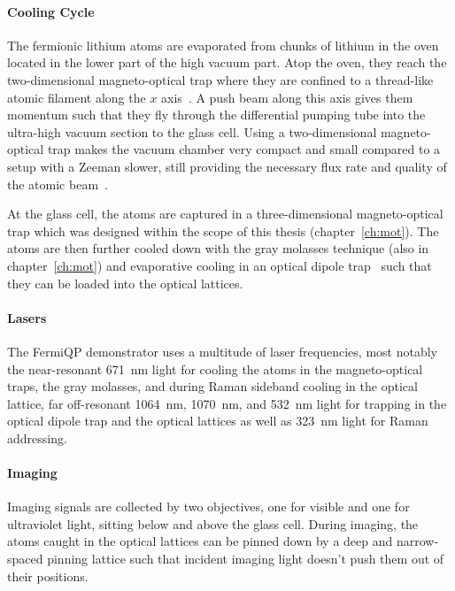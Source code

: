 \paragraph{Cooling Cycle}
The fermionic lithium atoms are evaporated from chunks of lithium in the oven located in the lower part of the high vacuum part. Atop the oven, they reach the two-dimensional magneto-optical trap where they are confined to a thread-like atomic filament along the $x$ axis~\cite{qesja_design_2022}.  A push beam along this axis gives them momentum such that they fly through the differential pumping tube into the ultra-high vacuum section to the glass cell. Using a two-dimensional magneto-optical trap makes the vacuum chamber very compact and small compared to a setup with a Zeeman slower, still providing the necessary flux rate and quality of the atomic beam~\cite{tiecke_high-flux_2009}.

At the glass cell, the atoms are captured in a three-dimensional magneto-optical trap which was designed within the scope of this thesis (chapter~\ref{ch:mot}). The atoms are then further cooled down with the gray molasses technique (also in chapter~\ref{ch:mot}) and evaporative cooling in an optical dipole trap~\cite{sun_construction_2022} such that they can be loaded into the optical lattices.

\paragraph{Lasers}
The FermiQP demonstrator uses a multitude of laser frequencies, most notably the near-resonant \SI[]{671}{\nano\meter} light for cooling the atoms in the magneto-optical traps, the gray molasses, and during Raman sideband cooling in the optical lattice, far off-resonant \SI[]{1064}{\nano\meter}, \SI[]{1070}{\nano\meter}, and \SI[]{532}{\nano\meter} light for trapping in the optical dipole trap and the optical lattices as well as \SI[]{323}{\nano\meter} light for Raman addressing.

\paragraph{Imaging}
Imaging signals are collected by two objectives, one for visible and one for ultraviolet light, sitting below and above the glass cell. During imaging, the atoms caught in the optical lattices can be pinned down by a deep and narrow-spaced pinning lattice such that incident imaging light doesn't push them out of their positions.

